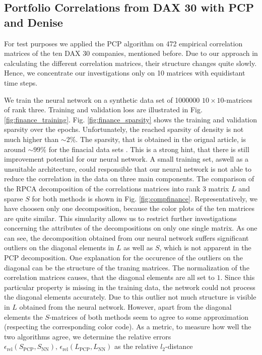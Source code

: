 \subsection{Portfolio Correlations from DAX 30 with PCP and Denise}
For test purposes we applied the PCP algorithm on 472 empirical correlation matrices of the ten DAX 30 companies, mentioned before. Due to our approach in calculating the different correlation matrices, their structure changes quite slowly. Hence, we concentrate our investigations only on 10 matrices with equidistant time steps.
\par
We train the neural network on a synthetic data set of 1000000 $10\times 10$-matrices of rank three. Training and validation loss are illustrated in Fig. \ref{fig:finance_training}. Fig. \ref{fig:finance_sparsity} shows the training and validation sparsity over the epochs. Unfortunately, the reached sparsity of density is not much higher than $\sim 2\%$. The sparsity, that is obtained in the orignal article, is around $\sim 99 \%$ for the finacial data sets \cite[Table 2.]{herrera2020denise}. This is a strong hint, that there is still improvement potential for our neural network. A small training set, aswell as a unsuitable architecture, could responsible that our neural network is not able to reduce the correlation in the data on three main components. The comparison of the RPCA decomposition of the correlations matrices into rank $3$ matrix $L$ and sparse $S$ for both methods is shown in Fig. \ref{fig:compfinance}. Representatively, we have choosen only one decomposition, because the color plots of the ten matrices are quite similar. This simularity allows us to restrict further investigations  concerning the attributes of the decompositions on only one single matrix. As one can see, the decomposition obtained from our neural network suffers significant outliers on the diagonal elements in $L$ as well as $S$, which is not apparent in the PCP decomposition. One explanation for the occurence of the outliers on the diagonal can be the structure of the traning matrices. The normalization of the correlation matrices causes, that the diagonal elements are all set to $1$. Since this particular property is missing in the training data, the network could not process the diagonal elements accurately. Due to this outlier not much structure is visible in $L$ obtained from the neural network. However, apart from the diagonal elements the $S$-matrices of both methods seem to agree to some approximation (respecting the corresponding color code). As a metric, to measure how well the two algorithms agree, we determine the relative errors $\epsilon_\text{rel} (S_\text{PCP}, S_\text{NN}),\, \epsilon_\text{rel} (L_\text{PCP}, L_\text{NN})$ as the relative $l_2$-distance

